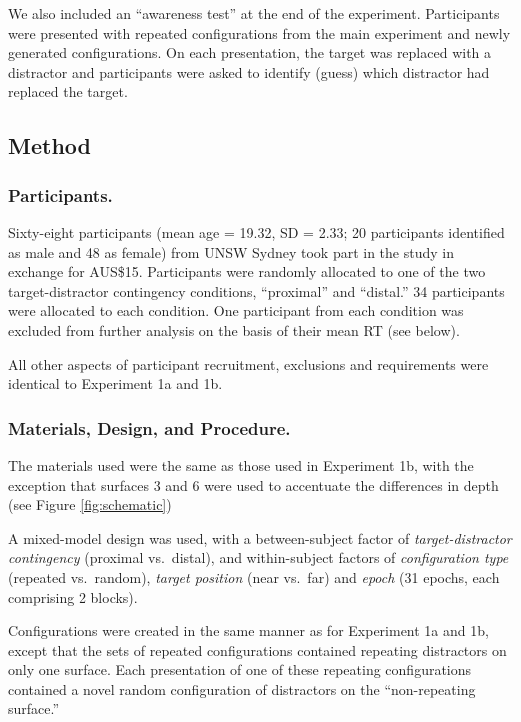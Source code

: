 \documentclass[
  english,
  man,floatsintext]{apa7}
\begin{document}
We also included an ``awareness test'' at the end of the experiment. Participants were presented with repeated configurations from the main experiment and newly generated configurations. On each presentation, the target was replaced with a distractor and participants were asked to identify (guess) which distractor had replaced the target.

\hypertarget{method}{%
\subsection{Method}\label{method}}

\hypertarget{participants.-2}{%
\subsubsection{Participants.}\label{participants.-2}}

Sixty-eight participants (mean age = 19.32, SD = 2.33; 20 participants identified as male and 48 as female) from UNSW Sydney took part in the study in exchange for AUS\$15. Participants were randomly allocated to one of the two target-distractor contingency conditions, ``proximal'' and ``distal.'' 34 participants were allocated to each condition. One participant from each condition was excluded from further analysis on the basis of their mean RT (see below).

All other aspects of participant recruitment, exclusions and requirements were identical to Experiment 1a and 1b.

\hypertarget{materials-design-and-procedure.-1}{%
\subsubsection{Materials, Design, and Procedure.}\label{materials-design-and-procedure.-1}}

The materials used were the same as those used in Experiment 1b, with the exception that surfaces 3 and 6 were used to accentuate the differences in depth (see Figure \ref{fig:schematic})

A mixed-model design was used, with a between-subject factor of \emph{target-distractor contingency} (proximal vs.~distal), and within-subject factors of \emph{configuration type} (repeated vs.~random), \emph{target position} (near vs.~far) and \emph{epoch} (31 epochs, each comprising 2 blocks).

Configurations were created in the same manner as for Experiment 1a and 1b, except that the sets of repeated configurations contained repeating distractors on only one surface. Each presentation of one of these repeating configurations contained a novel random configuration of distractors on the ``non-repeating surface.''
\end{document}
